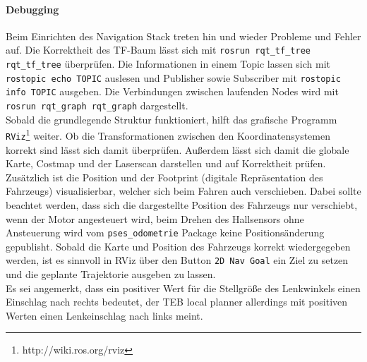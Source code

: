 \paragraph{Debugging}
Beim Einrichten des Navigation Stack treten hin und wieder Probleme und Fehler auf. Die Korrektheit des TF-Baum l\"asst sich mit \texttt{rosrun rqt\_tf\_tree rqt\_tf\_tree} \"uberpr\"ufen. Die Informationen in einem Topic lassen sich mit \texttt{rostopic echo TOPIC} auslesen und Publisher sowie Subscriber mit \texttt{rostopic info TOPIC} ausgeben. Die Verbindungen zwischen laufenden Nodes wird mit \texttt{rosrun rqt\_graph rqt\_graph} dargestellt.\\
Sobald die grundlegende Struktur funktioniert, hilft das grafische Programm \texttt{RViz}\footnote{http://wiki.ros.org/rviz} weiter. Ob die Transformationen zwischen den Koordinatensystemen korrekt sind l\"asst sich damit \"uberpr\"ufen. Au\ss{}erdem l\"asst sich damit die globale Karte, Costmap und der Laserscan darstellen und auf Korrektheit pr\"ufen. Zus\"atzlich ist die Position und der Footprint (digitale Repr\"asentation des Fahrzeugs) visualisierbar, welcher sich beim Fahren auch verschieben. Dabei sollte beachtet werden, dass sich die dargestellte Position des Fahrzeugs nur verschiebt, wenn der Motor angesteuert wird, beim Drehen des Hallsensors ohne Ansteuerung wird vom \texttt{pses\_odometrie} Package keine Positions\"anderung gepublisht. Sobald die Karte und Position des Fahrzeugs korrekt wiedergegeben werden, ist es sinnvoll in RViz \"uber den Button \texttt{2D Nav Goal} ein Ziel zu setzen und die geplante Trajektorie ausgeben zu lassen.\\
Es sei angemerkt, dass ein positiver Wert f\"ur die Stellgr\"o\ss{}e des Lenkwinkels einen Einschlag nach rechts bedeutet, der TEB local planner allerdings mit positiven Werten einen Lenkeinschlag nach links meint.

